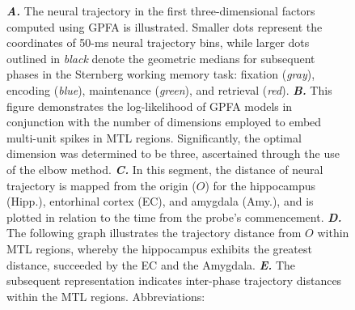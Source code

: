 \documentclass[final,3p,times,twocolumn]{elsarticle}
\begin{document}
\begin{figure}[ht]
{\textbf{\textit{A.}} The neural trajectory in the first three-dimensional factors computed using GPFA is illustrated. Smaller dots represent the coordinates of 50-ms neural trajectory bins, while larger dots outlined in \textit{black} denote the geometric medians for subsequent phases in the Sternberg working memory task: fixation (\textit{gray}), encoding (\textit{blue}), maintenance (\textit{green}), and retrieval (\textit{red})\cite{yu_gaussian-process_2009}. \textbf{\textit{B.}} This figure demonstrates the log-likelihood of GPFA models in conjunction with the number of dimensions employed to embed multi-unit spikes in MTL regions. Significantly, the optimal dimension was determined to be three, ascertained through the use of the elbow method\cite{virtanen_scipy_2020}. \textbf{\textit{C.}} In this segment, the distance of neural trajectory is mapped from the origin ($O$) for the hippocampus (Hipp.), entorhinal cortex (EC), and amygdala (Amy.), and is plotted in relation to the time from the probe's commencement\cite{boran_dataset_2020}. \textbf{\textit{D.}} The following graph illustrates the trajectory distance from $O$ within MTL regions, whereby the hippocampus exhibits the greatest distance, succeeded by the EC and the Amygdala\cite{fernandez-ruiz_long-duration_2019}. \textbf{\textit{E.}} The subsequent representation indicates inter-phase trajectory distances within the MTL regions\cite{liu_consensus_2022}.
Abbreviations:
}
        	\label{fig:02}
        \end{figure}
        \clearpage
\end{document}
